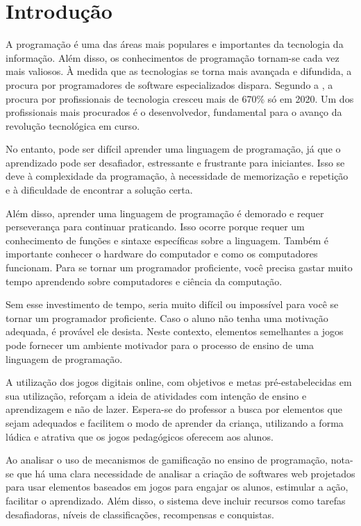 \documentclass[
	12pt,				%
	oneside,			%
	a4paper,			%
	english,			%
	french,				%
	spanish,			%
	brazil				%
	]{abntex2}
\renewenvironment{quote}
  {\small\list{}{\rightmargin=0.1cm \leftmargin=4cm}%
   \item\relax}
  {\endlist}
\begin{document}
\hypertarget{introduuxe7uxe3o}{%
\chapter{Introdução}\label{introduuxe7uxe3o}}

A programação é uma das áreas mais populares e importantes da tecnologia
da informação. Além disso, os conhecimentos de programação tornam-se
cada vez mais valiosos. À medida que as tecnologias se torna mais
avançada e difundida, a procura por programadores de software
especializados dispara. Segundo a \cite{procura-profissionais}, a
procura por profissionais de tecnologia cresceu mais de 670\% só em
2020. Um dos profissionais mais procurados é o desenvolvedor,
fundamental para o avanço da revolução tecnológica em curso.

No entanto, pode ser difícil aprender uma linguagem de programação, já
que o aprendizado pode ser desafiador, estressante e frustrante para
iniciantes. Isso se deve à complexidade da programação, à necessidade de
memorização e repetição e à dificuldade de encontrar a solução certa.

Além disso, aprender uma linguagem de programação é demorado e requer
perseverança para continuar praticando. Isso ocorre porque requer um
conhecimento de funções e sintaxe específicas sobre a linguagem. Também
é importante conhecer o hardware do computador e como os computadores
funcionam. Para se tornar um programador proficiente, você precisa
gastar muito tempo aprendendo sobre computadores e ciência da
computação.

Sem esse investimento de tempo, seria muito difícil ou impossível para
você se tornar um programador proficiente. Caso o aluno não tenha uma
motivação adequada, é provável ele desista. Neste contexto, elementos
semelhantes a jogos pode fornecer um ambiente motivador para o processo
de ensino de uma linguagem de programação.

\begin{quote}
A utilização dos jogos digitais online, com objetivos e metas
pré-estabelecidas em sua utilização, reforçam a ideia de atividades com
intenção de ensino e aprendizagem e não de lazer. Espera-se do professor
a busca por elementos que sejam adequados e facilitem o modo de aprender
da criança, utilizando a forma lúdica e atrativa que os jogos
pedagógicos oferecem aos alunos. \cite[p. 6]{utilizacao-jogos-digitais}
\end{quote}

Ao analisar o uso de mecanismos de gamificação no ensino de programação,
nota-se que há uma clara necessidade de analisar a criação de softwares
web projetados para usar elementos baseados em jogos para engajar os
alunos, estimular a ação, facilitar o aprendizado. Além disso, o sistema
deve incluir recursos como tarefas desafiadoras, níveis de
classificações, recompensas e conquistas.
\end{document}

